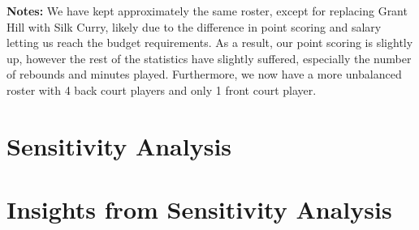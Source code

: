 \documentclass[a4paper,11pt]{article}
\begin{document}
\textbf{Notes:} We have kept approximately the same roster, except for replacing Grant Hill with Silk Curry, likely due to the difference in point scoring and salary letting us reach the budget requirements. As a result, our point scoring is slightly up, however the rest of the statistics have slightly suffered, especially the number of rebounds and minutes played. Furthermore, we now have a more unbalanced roster with 4 back court players and only 1 front court player.

\section{Sensitivity Analysis}


\section{Insights from Sensitivity Analysis}
\end{document}

